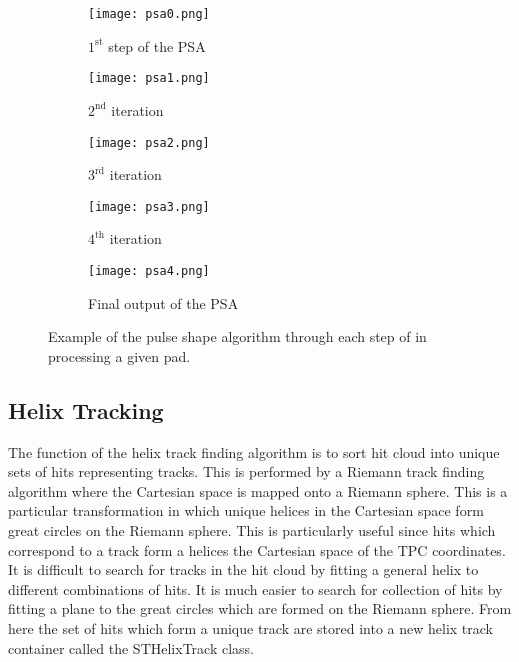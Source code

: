 \begin{figure}[!htb]
     \centering
     \begin{subfigure}[b]{0.24\textwidth}
         \centering
         \texttt{[image: psa0.png]}
         \caption{$\mathrm{1^{st}}$ step of the PSA}
         \label{fig:psa0}
     \end{subfigure}
     \hfill
     \centering
     \begin{subfigure}[b]{0.24\textwidth}
         \centering
         \texttt{[image: psa1.png]}
         \caption{$\mathrm{2^{nd}}$ iteration}
         \label{fig:psa1}
     \end{subfigure}
     \hfill
      \centering
     \begin{subfigure}[b]{0.24\textwidth}
         \centering
         \texttt{[image: psa2.png]}
         \caption{$\mathrm{3^{rd}}$ iteration}
         \label{fig:psa2}
     \end{subfigure}
     \hfill
      \centering
     \begin{subfigure}[b]{0.24\textwidth}
         \centering
         \texttt{[image: psa3.png]}
         \caption{$\mathrm{4^{th}}$ iteration}
         \label{fig:psa3}
     \end{subfigure}
     \hfill
     \centering
     \begin{subfigure}[b]{.5\textwidth}
         \centering
         \texttt{[image: psa4.png]}
         \caption{Final output of the PSA}
         \label{fig:psa4}
     \end{subfigure}
     \hfill
    
\caption{Example of the pulse shape algorithm through each step of in processing a given pad. }
\label{fig:psaTask}
\end{figure}


\subsection{Helix Tracking}
\label{sec:helixtrack}

 The function of the  helix track finding algorithm is to sort hit cloud into unique sets of hits representing tracks. This is performed by a Riemann track finding algorithm where the Cartesian space is mapped onto a Riemann sphere. This is a particular transformation in which unique helices in the Cartesian space form great circles on the Riemann sphere. This is particularly useful since hits which correspond to a track form a helices the Cartesian space of the TPC coordinates. It is difficult to search for tracks in the hit cloud by fitting a general helix to different combinations of hits. It is much easier to search for collection of hits by fitting a plane to the great circles which are formed on the Riemann sphere. From here the set of hits which form a unique track are stored into a new helix track container called the STHelixTrack class. 
 

